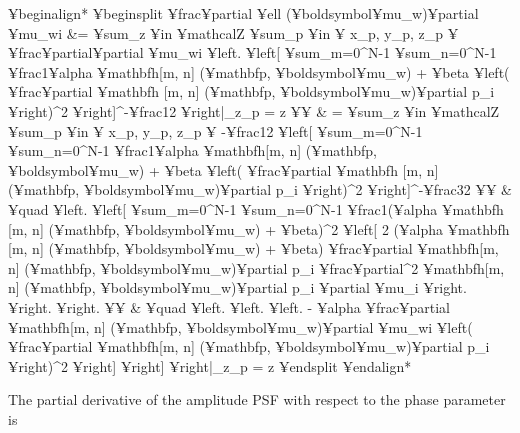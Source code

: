 ¥begin{align*}
	¥begin{split}
		¥frac{¥partial ¥ell (¥boldsymbol{¥mu}_{w})}{¥partial ¥mu_{wi}} &= ¥sum_{z ¥in ¥mathcal{Z}}  ¥sum_{p ¥in ¥{ x_{p}, y_{p}, z_{p} ¥} }
		¥frac{¥partial}{¥partial ¥mu_{wi}}  ¥left. ¥left[  ¥sum_{m=0}^{N-1}  ¥sum_{n=0}^{N-1} ¥frac{1}{¥alpha ¥mathbf{h}[m, n]
		(¥mathbf{p}, ¥boldsymbol{¥mu}_{w}) + ¥beta}
		¥left(  ¥frac{¥partial ¥mathbf{h} [m, n] (¥mathbf{p}, ¥boldsymbol{¥mu}_{w})}{¥partial p_{i}} ¥right)^{2}    ¥right]^{-¥frac{1}{2}} ¥right|_{z_{p} = z} ¥¥
		& = ¥sum_{z ¥in ¥mathcal{Z}}  ¥sum_{p ¥in ¥{ x_{p}, y_{p}, z_{p} ¥} } -¥frac{1}{2}
		¥left[  ¥sum_{m=0}^{N-1}  ¥sum_{n=0}^{N-1} ¥frac{1}{¥alpha ¥mathbf{h}[m, n]
		(¥mathbf{p}, ¥boldsymbol{¥mu}_{w}) + ¥beta}
		¥left(  ¥frac{¥partial ¥mathbf{h} [m, n] (¥mathbf{p}, ¥boldsymbol{¥mu}_{w})}{¥partial p_{i}} ¥right)^{2}    ¥right]^{-¥frac{3}{2}} ¥¥
		& ¥quad ¥left.   ¥left[   ¥sum_{m=0}^{N-1}  ¥sum_{n=0}^{N-1} ¥frac{1}{(¥alpha ¥mathbf{h} [m, n] (¥mathbf{p}, ¥boldsymbol{¥mu}_{w}) + ¥beta)^{2}} 
		¥left[  2 (¥alpha ¥mathbf{h} [m, n] (¥mathbf{p}, ¥boldsymbol{¥mu}_{w}) + ¥beta) 
		¥frac{¥partial ¥mathbf{h}[m, n] (¥mathbf{p}, ¥boldsymbol{¥mu}_{w})}{¥partial p_{i}} 
		¥frac{¥partial^{2} ¥mathbf{h}[m, n] (¥mathbf{p}, ¥boldsymbol{¥mu}_{w})}{¥partial p_{i} ¥partial ¥mu_{i}}  ¥right. ¥right. ¥right. ¥¥
		& ¥quad ¥left. ¥left. ¥left. 
		- ¥alpha ¥frac{¥partial ¥mathbf{h}[m, n] (¥mathbf{p}, ¥boldsymbol{¥mu}_{w})}{¥partial ¥mu_{wi}} ¥left(  
		¥frac{¥partial ¥mathbf{h}[m, n] (¥mathbf{p}, ¥boldsymbol{¥mu}_{w})}{¥partial p_{i}}  ¥right)^{2}
		¥right]  ¥right]             ¥right|_{z_{p} = z}
	¥end{split}
¥end{align*}


The partial derivative of the amplitude PSF with respect to the phase parameter is


